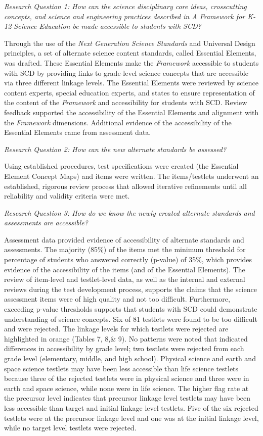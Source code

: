 \documentclass[11.5pt]{sig-alternate} %
\begin{document}
\begin{large}
\textit{Research Question 1: How can the science disciplinary core ideas, crosscutting concepts, and science and engineering practices described in A Framework for K-12 Science Education be made accessible to students with SCD?}

Through the use of the \textit{Next Generation Science Standards} and Universal Design principles, a set of alternate science content standards, called Essential Elements, was drafted. These Essential Elements make the \textit{Framework} accessible to students with SCD by providing links to grade-level science concepts that are accessible via three different linkage levels. The Essential Elements were reviewed by science content experts, special education experts, and states to ensure representation of the content of the \textit{Framework} and accessibility for students with SCD. Review feedback supported the accessibility of the Essential Elements and alignment with the \textit{Framework} dimensions. Additional evidence of the accessibility of the Essential Elements came from assessment data. 

\textit{Research Question 2: How can the new alternate standards be assessed?}

Using established procedures, test specifications were created (the Essential Element Concept Maps) and items were written. The items/testlets underwent an established, rigorous review process that allowed iterative refinements until all reliability and validity criteria were met. 

\textit{Research Question 3: How do we know the newly created alternate standards and assessments are accessible?}

Assessment data provided evidence of accessibility of alternate standards and assessments. The majority (85\%) of the items met the minimum threshold for percentage of students who answered correctly (p-value) of 35\%, which provides evidence of the accessibility of the items (and of the Essential Elements). The review of item-level and testlet-level data, as well as the internal and external reviews during the test development process, supports the claims that the science assessment items were of high quality and not too difficult. Furthermore, exceeding p-value thresholds supports that students with SCD could demonstrate understanding of science concepts. Six of 81 testlets were found to be too difficult and were rejected. The linkage levels for which testlets were rejected are highlighted in orange (Tables 7, 8,\& 9). No patterns were noted that indicated differences in accessibility by grade level; two testlets were rejected from each grade level (elementary, middle, and high school). Physical science and earth and space science testlets may have been less accessible than life science testlets because three of the rejected testlets were in physical science and three were in earth and space science, while none were in life science. The higher flag rate at the precursor level indicates that precursor linkage level testlets may have been less accessible than target and initial linkage level testlets. Five of the six rejected testlets were at the precursor linkage level and one was at the initial linkage level, while no target level testlets were rejected. 


\end{large}
\end{document}
